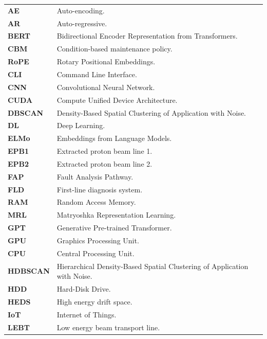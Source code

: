 \documentclass[10pt,oneside]{report}
\begin{document}
\begin{table}[ht]
    \centering
    \begin{tabular}{ll}

        \textbf{AE} & Auto-encoding. \\
        \textbf{AR} & Auto-regressive. \\
        \textbf{BERT} & Bidirectional Encoder Representation from Transformers. \\
        \textbf{CBM} & Condition-based maintenance policy. \\
        \textbf{RoPE} & Rotary Positional Embeddings. \\
        \textbf{CLI} & Command Line Interface. \\
        \textbf{CNN} & Convolutional Neural Network. \\
        \textbf{CUDA} & Compute Unified Device Architecture. \\
        \textbf{DBSCAN} & Density-Based Spatial Clustering of Application with Noise. \\
        \textbf{DL} & Deep Learning. \\
        \textbf{ELMo} & Embeddings from Language Models. \\
        \textbf{EPB1} & Extracted proton beam line 1. \\
        \textbf{EPB2} & Extracted proton beam line 2. \\
        \textbf{FAP} & Fault Analysis Pathway. \\
        \textbf{FLD} & First-line diagnosis system. \\
        \textbf{RAM} & Random Access Memory. \\
        \textbf{MRL} & Matryoshka Representation Learning. \\
        \textbf{GPT} & Generative Pre-trained Transformer. \\
        \textbf{GPU} & Graphics Processing Unit. \\
        \textbf{CPU} & Central Processing Unit. \\
        \textbf{HDBSCAN} & Hierarchical Density-Based Spatial Clustering of Application with Noise. \\
        \textbf{HDD} & Hard-Disk Drive. \\
        \textbf{HEDS} & High energy drift space. \\
        \textbf{IoT} & Internet of Things. \\
        \textbf{LEBT} & Low energy beam transport line. \\

\end{tabular}
\end{table}
\end{document}
